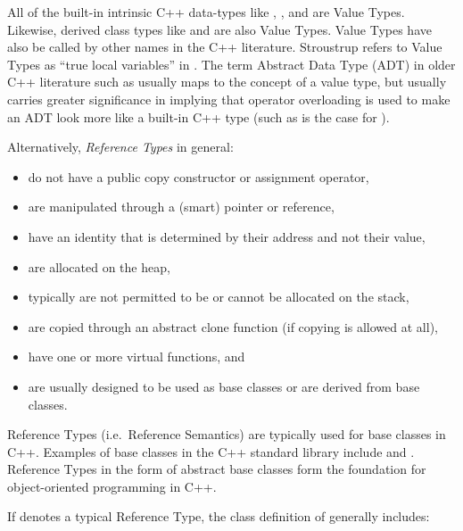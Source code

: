 \documentclass[pdf,ps2pdf,11pt]{SANDreport}
\begin{document}
All of the built-in intrinsic C++ data-types like {},
{}, and {} are Value Types.  Likewise,
derived class types like {} and
{} are also Value Types.  Value Types have also be
called by other names in the C++ literature.  Stroustrup refers to
Value Types as ``true local variables'' in {}\cite{stroustrup94}.  The
term Abstract Data Type (ADT) in older C++ literature such as
{}\cite{AdvancedC++92} usually maps to the concept of a value type,
but usually carries greater significance in implying that operator
overloading is used to make an ADT look more like a built-in C++ type
(such as is the case for {}).

Alternatively, {}\textit{Reference Types} in general:

\begin{itemize}

{}\item do not have a public copy constructor or assignment operator,

{}\item are manipulated through a (smart) pointer or reference,

{}\item have an identity that is determined by their address and not
their value,

{}\item are allocated on the heap,

{}\item typically are not permitted to be or cannot be allocated on
the stack,

{}\item are copied through an abstract clone function (if copying is
allowed at all),

{}\item have one or more virtual functions, and

{}\item are usually designed to be used as base classes or are derived
from base classes.

\end{itemize}

Reference Types (i.e.\ Reference Semantics) are typically used for base
classes in C++.  Examples of base classes in the C++ standard library
include {} and
{}.  Reference Types in the form of
abstract base classes form the foundation for object-oriented
programming in C++.

If {} denotes a typical Reference Type, the class definition
of {} generally includes:
\end{document}
